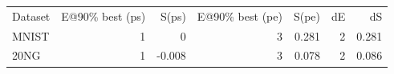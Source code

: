\begin{tabular}{lrrrrrr}
Dataset & E@90\% best (ps) & S(ps) & E@90\% best (pe) & S(pe) & dE & dS \\
MNIST & 1 & 0 & 3 & 0.281 & 2 & 0.281 \\
20NG & 1 & -0.008 & 3 & 0.078 & 2 & 0.086 \\
\end{tabular}
